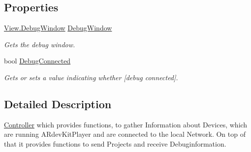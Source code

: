 \subsection*{Properties}
\begin{DoxyCompactItemize}
\item 
\hyperlink{class_a_rdev_kit_1_1_view_1_1_debug_window}{View.\-Debug\-Window} \hyperlink{class_a_rdev_kit_1_1_controller_1_1_connections_1_1_device_connection_1_1_device_connection_controller_acfe2c36b862f9b0775bf8e0f60d055ad}{Debug\-Window}
\begin{DoxyCompactList}\small\item\em Gets the debug window. \end{DoxyCompactList}\item 
bool \hyperlink{class_a_rdev_kit_1_1_controller_1_1_connections_1_1_device_connection_1_1_device_connection_controller_a6e1f49d1912fccc6edc212acbfc74c05}{Debug\-Connected}
\begin{DoxyCompactList}\small\item\em Gets or sets a value indicating whether \mbox{[}debug connected\mbox{]}. \end{DoxyCompactList}\end{DoxyCompactItemize}


\subsection{Detailed Description}
\hyperlink{namespace_a_rdev_kit_1_1_controller}{Controller} which provides functions, to gather Information about Devices, which are running A\-Rdev\-Kit\-Player and are connected to the local Network. On top of that it provides functions to send Projects and receive Debuginformation. 



